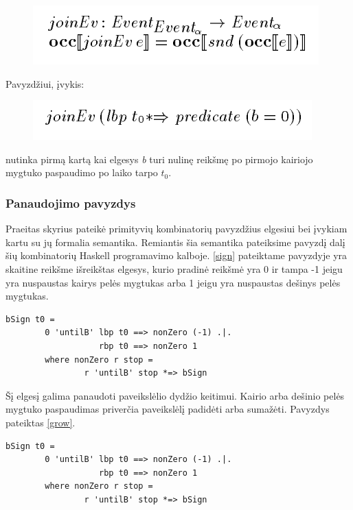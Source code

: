 \begin{itemize}
\begin{figure}[H]
	\centering
	\includegraphics[scale=0.75]{pics/14.png}
	\label{pic:14}
\end{figure}

	Pavyzdžiui, įvykis:

\begin{figure}[H]
	\centering
	\includegraphics[scale=0.75]{pics/15.png}
	\label{pic:15}
\end{figure}

	nutinka pirmą kartą kai elgesys \textit{b} turi nulinę reikšmę po pirmojo kairiojo mygtuko paspaudimo po laiko tarpo \(t_{0}\).

\end{itemize}

\subsubsection{Panaudojimo pavyzdys}

Praeitas skyrius pateikė primityvių kombinatorių pavyzdžius elgesiui bei įvykiam kartu su jų formalia semantika. Remiantis šia semantika pateiksime pavyzdį dalį šių kombinatorių Haskell programavimo kalboje. \ref{sign} pateiktame pavyzdyje yra skaitine reikšme išreikštas elgesys, kurio pradinė reikšmė yra 0 ir tampa -1 jeigu yra nuspaustas kairys pelės mygtukas arba 1 jeigu yra nuspaustas dešinys pelės mygtukas.

\begin{lstlisting}[caption=- signalo funkcija nuo pelės mygtuko paspaudimo, label=sign]
	bSign t0 =
		0 'untilB' lbp t0 ==> nonZero (-1) .|.
				   rbp t0 ==> nonZero 1
		where nonZero r stop =
				r 'untilB' stop *=> bSign
\end{lstlisting}

Šį elgesį galima panaudoti paveikslėlio dydžio keitimui. Kairio arba dešinio pelės mygtuko paspaudimas priverčia paveikslėlį padidėti arba sumažėti. Pavyzdys pateiktas \ref{grow}.


\begin{lstlisting}[caption=- paveiksliuko dydžio modifikavimas pelės paspaudimu, label=grow]
	bSign t0 =
		0 'untilB' lbp t0 ==> nonZero (-1) .|.
				   rbp t0 ==> nonZero 1
		where nonZero r stop =
				r 'untilB' stop *=> bSign
\end{lstlisting}






